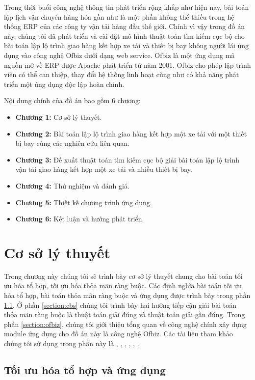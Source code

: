 \documentclass[a4paper,12pt]{report}
\begin{document}
Trong thời buổi công nghệ thông tin phát triển rộng khắp như hiện nay, bài toán lập lịch vận chuyển hàng hóa gần như là một phần không thể thiếu trong hệ thống \ac{ERP} của các công ty vận tải hàng đầu thế giới. Chính vì vậy trong đồ án này, chúng tôi đã phát triển và cài đặt mô hình thuật toán tìm kiếm cục bộ cho bài toán lập lộ trình giao hàng kết hợp xe tải và thiết bị bay không người lái ứng dụng vào công nghệ Ofbiz dưới dạng web service. Ofbiz là một ứng dụng mã nguồn mở về \ac{ERP} được Apache phát triển từ năm 2001. Ofbiz cho phép lập trình viên có thể can thiệp, thay đổi hệ thống linh hoạt cũng như có khả năng phát triển một ứng dụng độc lập hoàn chỉnh. 

Nội dung chính của đồ án bao gồm 6 chương:
\begin{itemize}
\item \textbf{Chương 1:} Cơ sở lý thuyết.
\item \textbf{Chương 2:} Bài toán lập lộ trình giao hàng kết hợp một xe tải với một thiết bị bay cùng các nghiên cứu liên quan.
\item \textbf{Chương 3:} Đề xuất thuật toán tìm kiếm cục bộ giải bài toán lập lộ trình vận tải giao hàng kết hợp một xe tải và nhiều thiết bị bay.
\item \textbf{Chương 4:} Thử nghiệm và đánh giá.
\item \textbf{Chương 5:} Thiết kế chương trình ứng dụng.
\item \textbf{Chương 6:} Kết luận và hướng phát  triển.
\end{itemize}

\chapter{Cơ sở lý thuyết}
Trong chương này chúng tôi sẽ trình bày cơ sở lý thuyết chung cho bài toán tối ưu hóa tổ hợp, tối ưu hóa thỏa mãn ràng buộc. Các định nghĩa bài toán tối ưu hóa tổ hợp, bài toán thỏa mãn ràng buộc và ứng dụng được trình bày trong phần \ref{section:cbo}. Ở phần \ref{section:cbs} chúng tôi trình bày hai hướng tiếp cận giải bài toán thỏa mãn ràng buộc là thuật toán giải đúng và thuật toán giải gần đúng. Trong phần \ref{section:ofbiz}, chúng tôi giới thiệu tổng quan về công nghệ chính xây dựng module ứng dụng cho đồ án này là công nghệ Ofbiz. Các tài liệu tham khảo chúng tôi sử dụng trong phần này là \cite{csplib30}, \cite{AIAMAB},  \cite{HCP}, \cite{IP},  \cite{TRR},  \cite{AOW}.
\section{Tối ưu hóa tổ hợp và ứng dụng}
\label{section:cbo}
\end{document}
